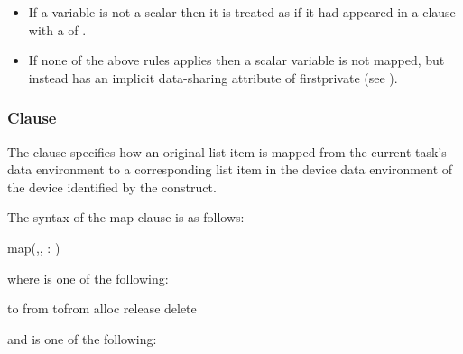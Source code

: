 \begin{itemize}

\item If a variable is not a scalar then it is treated as if it had appeared 
      in a  clause with a  of .


\item If none of the above rules applies then a scalar variable is not
      mapped, but instead has an implicit data-sharing attribute of
      firstprivate (see ).
\end{itemize}



\subsubsection{ Clause}
\label{subsec:map Clause}
\summary
The  clause specifies how an original list item is mapped from the 
current task's data environment to a corresponding list item in the device 
data environment of the device identified by the construct.

\syntax
The syntax of the map clause is as follows:

\begin{ompSyntax}
map(\plc{[ [map-type-modifier[},\plc{] [map-type-modifier[},\plc{] ...] map-type} : \plc{] locator-list})
\end{ompSyntax}

where  is one of the following:

\begin{indentedcodelist}
to
from
tofrom
alloc
release
delete
\end{indentedcodelist}

and  is one of the following:

